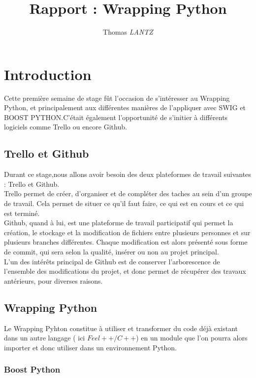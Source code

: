 \documentclass[12pt]{article}
\title {Rapport : Wrapping Python}
\author {Thomas \emph{LANTZ}}
\begin{document}
\maketitle 

\section{Introduction}

Cette première semaine de stage fût l'occasion de s'intéresser au Wrapping Python, et principalement aux différentes manières de l'appliquer avec SWIG et BOOST PYTHON.C'était également l'opportunité de s'initier à différents logiciels comme Trello ou encore Github.

\subsection{Trello et Github}

Durant ce stage,nous allons avoir besoin des deux plateformes de travail suivantes : Trello et Github.\\

Trello permet de créer, d'organiser et de compléter des taches au sein d'un groupe de travail. Cela permet de situer ce qu'il faut faire, ce qui est en cours et ce qui est terminé.\\

Github, quand à lui, est une plateforme de travail participatif qui permet la création,
le stockage et la modification de fichiers entre plusieurs personnes et sur plusieurs branches différentes. Chaque modification est alors présenté sous forme de commit, qui sera selon la qualité, insérer ou non au projet principal.\\

L'un des intérêts principal de Github est de conserver l'arborescence de l'ensemble des modifications du projet, et donc permet de récupérer des travaux antérieurs, pour diverses raisons.\\

\subsection{Wrapping Python}

Le Wrapping Pyhton constitue à utiliser et transformer du code déjà existant dans un autre langage ( ici $ Feel++/C++$) en un module que l'on pourra alors importer et donc utiliser dans un environnement Python.

\subsubsection{Boost Python}
\end{document}
